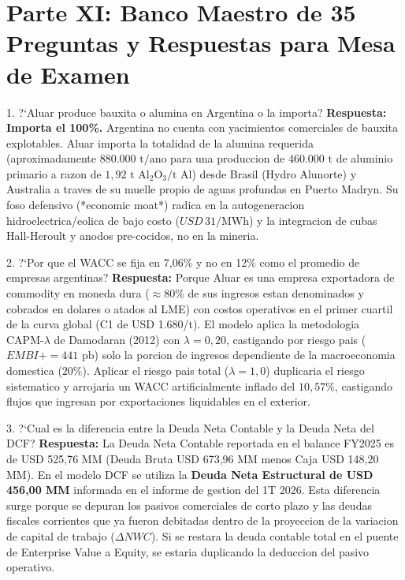 \documentclass[10pt,a4paper]{article}
\theoremstyle{definition}
\begin{document}
\section{Parte XI: Banco Maestro de 35 Preguntas y Respuestas para Mesa de Examen}

\begin{examquestion}{1. ?`Aluar produce bauxita o alumina en Argentina o la importa?}
\textbf{Respuesta:} \textbf{Importa el 100\%.} Argentina no cuenta con yacimientos comerciales de bauxita explotables. Aluar importa la totalidad de la alumina requerida (aproximadamente $880.000\text{ t/ano}$ para una produccion de $460.000\text{ t}$ de aluminio primario a razon de $1,92\text{ t Al}_2\text{O}_3/\text{t Al}$) desde Brasil (Hydro Alunorte) y Australia a traves de su muelle propio de aguas profundas en Puerto Madryn. Su foso defensivo (*economic moat*) radica en la autogeneracion hidroelectrica/eolica de bajo costo ($USD\,31/\text{MWh}$) y la integracion de cubas Hall-Heroult y anodos pre-cocidos, no en la mineria.
\end{examquestion}

\begin{examquestion}{2. ?`Por que el WACC se fija en 7,06\% y no en 12\% como el promedio de empresas argentinas?}
\textbf{Respuesta:} Porque Aluar es una empresa exportadora de commodity en moneda dura ($\approx 80\%$ de sus ingresos estan denominados y cobrados en dolares o atados al LME) con costos operativos en el primer cuartil de la curva global (C1 de USD 1.680/t). El modelo aplica la metodologia $\text{CAPM-}\lambda$ de Damodaran (2012) con $\lambda = 0,20$, castigando por riesgo pais ($EMBI+ = 441\text{ pb}$) solo la porcion de ingresos dependiente de la macroeconomia domestica ($20\%$). Aplicar el riesgo pais total ($\lambda = 1,0$) duplicaria el riesgo sistematico y arrojaria un WACC artificialmente inflado del $10,57\%$, castigando flujos que ingresan por exportaciones liquidables en el exterior.
\end{examquestion}

\begin{examquestion}{3. ?`Cual es la diferencia entre la Deuda Neta Contable y la Deuda Neta del DCF?}
\textbf{Respuesta:} La Deuda Neta Contable reportada en el balance FY2025 es de USD 525,76 MM (Deuda Bruta USD 673,96 MM menos Caja USD 148,20 MM). En el modelo DCF se utiliza la \textbf{Deuda Neta Estructural de USD 456,00 MM} informada en el informe de gestion del 1T 2026. Esta diferencia surge porque se depuran los pasivos comerciales de corto plazo y las deudas fiscales corrientes que ya fueron debitadas dentro de la proyeccion de la variacion de capital de trabajo ($\Delta NWC$). Si se restara la deuda contable total en el puente de Enterprise Value a Equity, se estaria duplicando la deduccion del pasivo operativo.
\end{examquestion}
\end{document}
